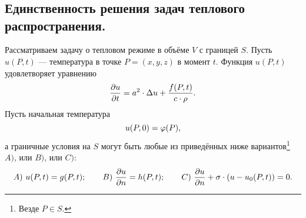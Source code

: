 \chapter{}
\label{lecture19}
\section{Единственность решения задач теплового распространения.}
\label{lecture19section1}
Рассматриваем задачу о тепловом режиме в объёме $V$ с границей $S$. Пусть $u(P,t)$ --- температура в точке $P=(x,y,z)$ в момент $t$. Функция $u(P,t)$ удовлетворяет уравнению
\begin{equation}\label{l19:eq:1}
	\hfill \pder{u}{t}=a^2\cdot\Delta u+\frac{f(P,t)}{c\cdot\rho}. \hfill
\end{equation}
Пусть начальная температура 
\begin{equation}\label{l19:eq:2}
	\hfill u(P,0)=\phi(P),\hfill
\end{equation}
а граничные условия на $S$ могут быть любые из приведённых ниже вариантов\footnote[1]{Везде $P\in S$.} $A)$, или $B)$, или $C)$:
\begin{equation}\label{l19:eq:3}
	\hfill A)\ u(P,t)=g(P,t);\qquad B)\ \pder{u}{n}=h(P,t);\qquad C)\ \pder{u}{n}+\sigma\cdot(u-u_0(P,t))=0.\hfill
\end{equation}  
